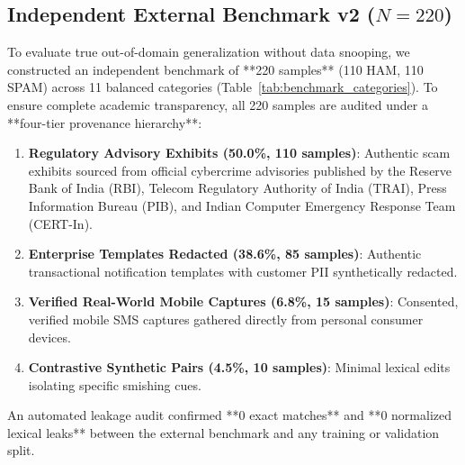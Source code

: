 \documentclass[conference]{IEEEtran}
\begin{document}
\subsection{Independent External Benchmark v2 ($N=220$)}
To evaluate true out-of-domain generalization without data snooping, we constructed an independent benchmark of **220 samples** (110 HAM, 110 SPAM) across 11 balanced categories (Table~\ref{tab:benchmark_categories}). To ensure complete academic transparency, all 220 samples are audited under a **four-tier provenance hierarchy**:
\begin{enumerate}
    \item \textbf{Regulatory Advisory Exhibits (50.0\%, 110 samples)}: Authentic scam exhibits sourced from official cybercrime advisories published by the Reserve Bank of India (RBI), Telecom Regulatory Authority of India (TRAI), Press Information Bureau (PIB), and Indian Computer Emergency Response Team (CERT-In).
    \item \textbf{Enterprise Templates Redacted (38.6\%, 85 samples)}: Authentic transactional notification templates with customer PII synthetically redacted.
    \item \textbf{Verified Real-World Mobile Captures (6.8\%, 15 samples)}: Consented, verified mobile SMS captures gathered directly from personal consumer devices.
    \item \textbf{Contrastive Synthetic Pairs (4.5\%, 10 samples)}: Minimal lexical edits isolating specific smishing cues.
\end{enumerate}

An automated leakage audit confirmed **0 exact matches** and **0 normalized lexical leaks** between the external benchmark and any training or validation split.
\end{document}
